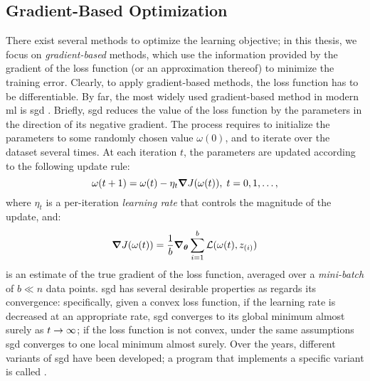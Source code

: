 \subsection{Gradient-Based Optimization}
There exist several methods to optimize the learning objective; in this thesis, we focus on \emph{gradient-based} methods, which use the information provided by the gradient of the loss function (or an approximation thereof) to minimize the training error. Clearly, to apply gradient-based methods, the loss function has to be differentiable. By far, the most widely used gradient-based method in modern \gls{ml} is \gls{sgd} \citep{ruder2016overviewsgd}. Briefly, \gls{sgd} reduces the value of the loss function by  the parameters in the direction of its negative gradient. The process requires to initialize the parameters to some randomly chosen value $\omega(0)$, and to iterate over the dataset several times. At each iteration $t$, the parameters are updated according to the following update rule:
$$ \omega(t+1) = \omega(t) - \eta_t \grad J(\omega(t)),\; t= 0, 1, \ldots,$$
where $\eta_t$ is a per-iteration \emph{learning rate} that controls the magnitude of the update, and:
$$ \grad J(\omega(t)) = \frac{1}{b} \grad_{\Param}  \sum_{i=1}^{b} \Loss(\omega(t), \Pattern{z}{i})$$
is an estimate of the true gradient of the loss function, averaged over a \emph{mini-batch} of $b \ll n$ data points. \gls{sgd} has several desirable properties as regards its convergence: specifically, given a convex loss function, if the learning rate is decreased at an appropriate rate, \gls{sgd} converges to its global minimum almost surely as $t \shortrightarrow \infty$; if the loss function is not convex, under the same assumptions \gls{sgd} converges to one local minimum almost surely. Over the years, different variants of \gls{sgd} have been developed; a program that implements a specific variant is called .

